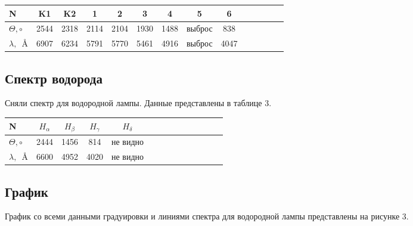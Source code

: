 \begin{table}[h!]
    \begin{center}

        \begin{tabular}{|l|c|c|c|c|c|c|c|c|c|c|c|c|c|}
        \hline
        N                   & K1    & K2  & 1    & 2    & 3    & 4    & 5      & 6    \\ \hline
        $ \Theta, \circ $   & 2544 & 2318 & 2114 & 2104 & 1930 & 1488 & выброс & 838  \\ \hline
        $ \lambda, \, $ \AA & 6907 & 6234 & 5791 & 5770 & 5461 & 4916 & выброс & 4047 \\ \hline
        \end{tabular}

    \end{center}
\end{table}

\subsection{Спектр водорода}

Сняли спектр для водородной лампы. Данные представлены в таблице 3.

\begin{table}[h!]
    \begin{center}

        \begin{tabular}{|l|c|c|c|c|c|c|c|c|c|c|c|c|c|}
        \hline
        N                   & $ H_\alpha $ & $ H_\beta $ & $ H_\gamma $ & $ H_\delta $ \\ \hline
        $ \Theta, \circ $   & 2444         & 1456        & 814          & не видно     \\ \hline
        $ \lambda, \, $ \AA & 6600         & 4952        & 4020         & не видно     \\ \hline
        \end{tabular}

    \end{center}
\end{table}

\newpage

\subsection{График}

График со всеми данными градуировки и линиями спектра для водородной лампы представлены
на рисунке 3.

